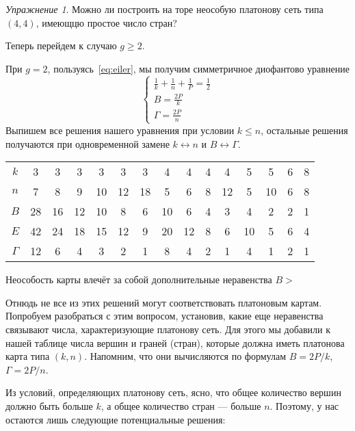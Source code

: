 \documentclass[12pt, a4paper, openany]{amsart}
\theoremstyle{plain}
\theoremstyle{definition}
\theoremstyle{remark}
\newtheorem{ex}[theorem]{Упражнение}
\begin{document}
\begin{ex}
  Можно ли построить на торе неособую платонову сеть типа $(4,4)$,
  имеющцю простое число стран?
\end{ex}	     


Теперь перейдем к случаю $g\ge 2$. 

При $g=2$, пользуясь~\ref{eq:eiler}, мы получим симметричное
диофантово уравнение
\begin{equation}\label{eq:eilerg2}
  \begin{cases}
    \frac{1}{k}+\frac{1}{n}+\frac{1}{P}=\frac{1}{2}\\
    B=\frac{2P}{k}\\
    \Gamma=\frac{2P}{n}
  \end{cases}
\end{equation}
Выпишем все решения нашего уравнения при условии $k\leq n$, остальные
решения получаются при одновременной замене $k\leftrightarrow n$ и
$B\leftrightarrow\Gamma$.

\begin{tabular}{c|cccccccccccccc}
  $k$ & 3 & 3 & 3 & 3 & 3 & 3 & 4 & 4 & 4 & 4 & 5 & 5 & 6 & 8 \\
  $n$ & 7 & 8 & 9 & 10 & 12 & 18 & 5 & 6 & 8 & 12 & 5 & 10 & 6 & 8 \\
  \hline
  $B$ & 28 & 16 & 12 & 10 & 8 & 6 & 10 & 6 & 4 & 3 & 4 & 2 & 2 & 1\\
  $E$ & 42 & 24 & 18 & 15 & 12 & 9 & 20 & 12 & 8 & 6 & 10 & 5 & 6 & 4 \\
  $\Gamma$ & 12 & 6 & 4 & 3 & 2 & 1 & 8 & 4 & 2 & 1 & 4 & 1 & 2 & 1\\
\end{tabular}
                                                                
Неособость карты влечёт за собой дополнительные неравенства $B>$


Отнюдь не все из этих решений могут соответствовать платоновым картам.
Попробуем разобраться с этим вопросом, установив, какие еще неравенства связывают
числа, характеризующие платонову сеть. Для этого мы добавили к нашей таблице числа вершин и граней (стран), которые должна иметь платонова карта типа $(k,n)$. Напомним, что они вычисляются по формулам $B=2P/k$, $\Gamma=2P/n$.



Из условий, определяющих платонову сеть, ясно, что общее количество вершин должно быть больше $k$, а общее количество стран --- больше $n$. Поэтому, у нас остаются лишь следующие потенциальные решения:
\end{document}
